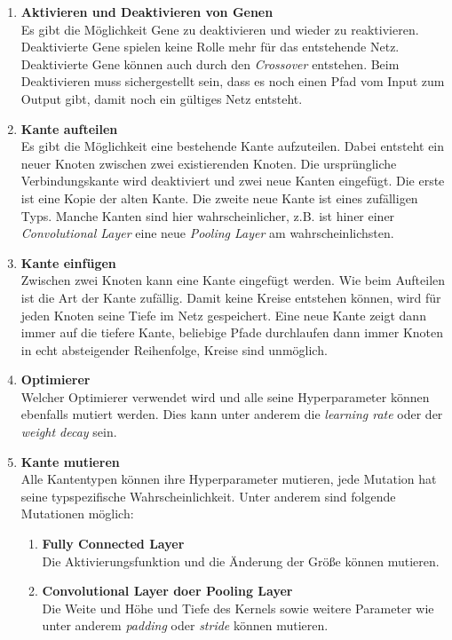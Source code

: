 \documentclass[]{scrartcl}
\begin{document}
			\begin{enumerate}
				\item [] \textbf{Aktivieren und Deaktivieren von Genen} \\
					Es gibt die Möglichkeit Gene zu deaktivieren und wieder zu reaktivieren. Deaktivierte Gene spielen keine Rolle mehr für das entstehende Netz.
					Deaktivierte Gene können auch durch den \textit{Crossover} entstehen. Beim Deaktivieren muss sichergestellt sein, dass
					es noch einen Pfad vom Input zum Output gibt, damit noch ein gültiges Netz entsteht.

				\item [] \textbf{Kante aufteilen} \\
					Es gibt die Möglichkeit eine bestehende Kante aufzuteilen. Dabei entsteht ein neuer Knoten zwischen zwei existierenden Knoten.
					Die ursprüngliche Verbindungskante wird deaktiviert und zwei neue Kanten eingefügt. Die erste ist eine Kopie der alten Kante.
					Die zweite neue Kante ist eines zufälligen Typs. Manche Kanten sind hier wahrscheinlicher, z.B. ist hiner einer
					\textit{Convolutional Layer} eine neue \textit{Pooling Layer} am wahrscheinlichsten.

				\item [] \textbf{Kante einfügen} \\
					Zwischen zwei Knoten kann eine Kante eingefügt werden. Wie beim Aufteilen ist die Art der Kante zufällig.
					Damit keine Kreise entstehen können, wird für jeden Knoten seine Tiefe im Netz gespeichert.
					Eine neue Kante zeigt dann immer auf die tiefere Kante, beliebige Pfade durchlaufen dann immer Knoten in echt absteigender Reihenfolge,
					Kreise sind unmöglich.

				\item [] \textbf{Optimierer} \\
					Welcher Optimierer verwendet wird und alle seine Hyperparameter können ebenfalls mutiert werden.
					Dies kann unter anderem die \textit{learning rate} oder der \textit{weight decay} sein.

				\item [] \textbf{Kante mutieren} \\
					Alle Kantentypen können ihre Hyperparameter mutieren, jede Mutation hat seine typspezifische Wahrscheinlichkeit.
					Unter anderem sind folgende Mutationen möglich:
					\begin{enumerate}
						\item [] \textbf{Fully Connected Layer} \\
							Die Aktivierungsfunktion und die Änderung der Größe können mutieren.
						\item [] \textbf{Convolutional Layer doer Pooling Layer} \\
							Die Weite und Höhe und Tiefe des Kernels sowie weitere Parameter wie unter anderem \textit{padding} oder \textit{stride} können mutieren.
					\end{enumerate}
			\end{enumerate}
\end{document}
